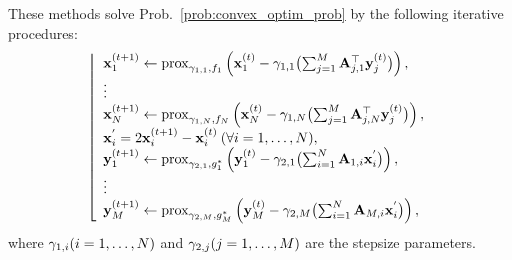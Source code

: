 These methods solve Prob.~\eqref{prob:convex_optim_prob} by the following iterative procedures:
\begin{equation}
	\label{algo:P-PDS}
	\left\lfloor 
		\begin{array}{l}
			\mathbf{x}_{1}^{(t+1)} 
			\leftarrow \operatorname{prox}_{\gamma_{1, 1}, f_{1}}
			\left( \mathbf{x}_{1}^{(t)} - \gamma_{1,1} \bigl( \sum_{j=1}^{M} \mathbf{A}_{j,1}^{\top} \mathbf{y}_{j}^{(t)} \bigr) \right), \\
			\vdots \\
			\mathbf{x}_{N}^{(t+1)} 
			\leftarrow \operatorname{prox}_{\gamma_{1, N}, f_{N}}
			\left( \mathbf{x}_{N}^{(t)} - \gamma_{1, N} \bigl( \sum_{j=1}^{M} \mathbf{A}_{j,N}^{\top} \mathbf{y}_{j}^{(t)} \bigr) \right), \\
			\mathbf{x}_{i}^{'} = 2\mathbf{x}_{i}^{(t+1)} - \mathbf{x}_{i}^{(t)} \: (\forall i = 1, \ldots, N), \\
			\mathbf{y}_{1}^{(t+1)}
			\leftarrow \operatorname{prox}_{\gamma_{2, 1}, g_{1}^{*}}
			\left( \mathbf{y}_{1}^{(t)} - \gamma_{2, 1}
			\bigl(\sum_{i=1}^{N} \mathbf{A}_{1,i} \mathbf{x}_{i}^{'} \bigr) \right), \\
			\vdots \\
			\mathbf{y}_{M}^{(t+1)}
			\leftarrow \operatorname{prox}_{\gamma_{2, M}, g_{M}^{*}}
			\left( \mathbf{y}_{M}^{(t)} - \gamma_{2, M}
			\bigl(\sum_{i=1}^{N} \mathbf{A}_{M,i}  \mathbf{x}_{i}^{'} \bigr) \right), \\
		\end{array}
	 \right.
\end{equation}
where $\gamma_{1, i}(i = 1, \dots, N)$ and $\gamma_{2, j}(j = 1, \dots, M)$ are the stepsize parameters.


